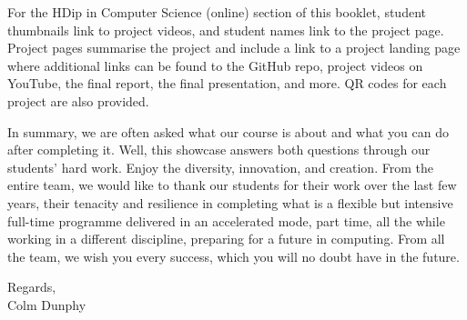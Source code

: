\documentclass{report}
\begin{document}
\vspace{0.4cm}
For the HDip in Computer Science (online) section of this booklet, student thumbnails link to project videos, and student names link to the project page. Project pages summarise the project and include a link to a project landing page where additional links can be found to the GitHub repo, project videos on YouTube, the final report, the final presentation, and more. QR codes for each project are also provided.

\vspace{0.4cm}
In summary, we are often asked what our course is about and what you can do after completing it. Well, this showcase answers both questions through our students' hard work. Enjoy the diversity, innovation, and creation. From the entire team, we would like to thank our students for their work over the last few years, their tenacity and resilience in completing what is a flexible but intensive full-time programme delivered in an accelerated mode, part time, all the while working in a different discipline, preparing for a future in computing. From all the team, we wish you every success, which you will no doubt have in the future.

\vspace{0.4cm}
Regards,\\
Colm Dunphy 

\vspace{-0.3cm}

\clearpage
\end{document}
